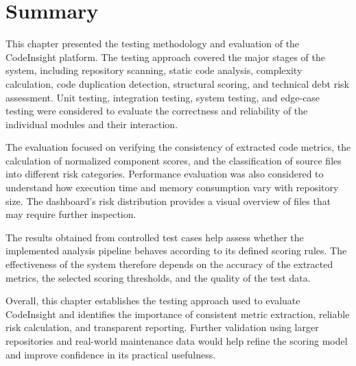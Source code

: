 \clearpage
\section{Summary}
This chapter presented the testing methodology and evaluation of the CodeInsight platform. The testing approach covered the major stages of the system, including repository scanning, static code analysis, complexity calculation, code duplication detection, structural scoring, and technical debt risk assessment. Unit testing, integration testing, system testing, and edge-case testing were considered to evaluate the correctness and reliability of the individual modules and their interaction.

The evaluation focused on verifying the consistency of extracted code metrics, the calculation of normalized component scores, and the classification of source files into different risk categories. Performance evaluation was also considered to understand how execution time and memory consumption vary with repository size. The dashboard's risk distribution provides a visual overview of files that may require further inspection.

The results obtained from controlled test cases help assess whether the implemented analysis pipeline behaves according to its defined scoring rules. The effectiveness of the system therefore depends on the accuracy of the extracted metrics, the selected scoring thresholds, and the quality of the test data.

Overall, this chapter establishes the testing approach used to evaluate CodeInsight and identifies the importance of consistent metric extraction, reliable risk calculation, and transparent reporting. Further validation using larger repositories and real-world maintenance data would help refine the scoring model and improve confidence in its practical usefulness.

